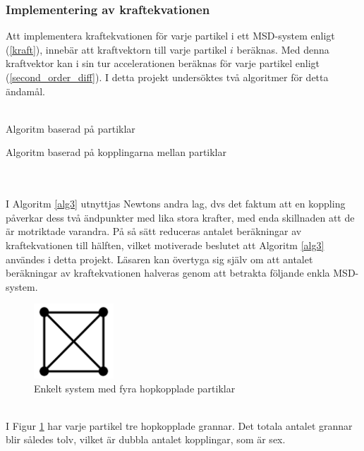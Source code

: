 \documentclass[a4paper,12pt,oneside,final,swedish]{extarticle}
\begin{document}
\subsubsection{Implementering av kraftekvationen}
Att implementera kraftekvationen för varje partikel i ett MSD-system enligt (\ref{kraft}), innebär att kraftvektorn till varje partikel $i$ beräknas. Med denna kraftvektor kan i sin tur accelerationen beräknas för varje partikel enligt (\ref{second_order_diff}). I detta projekt undersöktes två algoritmer för detta ändamål.\\\\
\begin{algorithm}[H]
\caption{Algoritm baserad på partiklar\label{alg2}}
\end{algorithm}
\begin{algorithm}[H]
\caption{Algoritm baserad på kopplingarna mellan partiklar\label{alg3}}
\end{algorithm}
\noindent \\\\I Algoritm \ref{alg3} utnyttjas Newtons andra lag, dvs det faktum att en koppling påverkar dess två ändpunkter med lika stora krafter, med enda skillnaden att de är motriktade varandra. På så sätt reduceras antalet beräkningar av kraftekvationen till hälften, vilket motiverade beslutet att Algoritm \ref{alg3} användes i detta projekt. Läsaren kan övertyga sig själv om att antalet beräkningar av kraftekvationen halveras genom att betrakta följande enkla MSD-system.
\begin{figure}[h!]
  \begin{center}
    \includegraphics[width=3cm]{Bilder/2D_2x2.png} 
  \end{center}
  \caption{Enkelt system med fyra hopkopplade partiklar}
  \label{enkelfyra::nonfloat}
\end{figure}
\\I Figur \ref{enkelfyra::nonfloat} har varje partikel tre hopkopplade grannar. Det totala antalet grannar blir således tolv, vilket är dubbla antalet kopplingar, som är sex.
\end{document}
